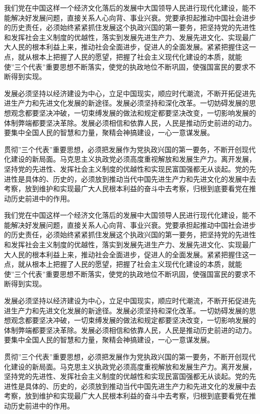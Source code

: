 \documentclass[adobefonts]{njuthesis}
\begin{document}
我们党在中国这样一个经济文化落后的发展中大国领导人民进行现代化建设，能不能解决好发展问题，直接关系人心向背、事业兴衰。党要承担起推动中国社会进步的历史责任，必须始终紧紧抓住发展这个执政兴国的第一要务，把坚持党的先进性和发挥社会主义制度的优越性，落实到发展先进生产力、发展先进文化、实现最广大人民的根本利益上来，推动社会全面进步，促进人的全面发展。紧紧把握住这一点，就从根本上把握了人民的愿望，把握了社会主义现代化建设的本质，就能使”三个代表”重要思想不断落实，使党的执政地位不断巩固，使强国富民的要求不断得到实现。 

发展必须坚持以经济建设为中心，立足中国现实，顺应时代潮流，不断开拓促进先进生产力和先进文化发展的新途径。发展必须坚持和深化改革。一切妨碍发展的思想观念都要坚决冲破，一切束缚发展的做法和规定都要坚决改变，一切影响发展的体制弊端都要坚决革除。发展必须相信和依靠人民，人民是推动历史前进的动力。要集中全国人民的智慧和力量，聚精会神搞建设，一心一意谋发展。 

贯彻”三个代表”重要思想，必须把发展作为党执政兴国的第一要务，不断开创现代化建设的新局面。马克思主义执政党必须高度重视解放和发展生产力。离开发展，坚持党的先进性、发挥社会主义制度的优越性和实现民富国强都无从谈起。党的先进性是具体的、历史的，必须放到推动当代中国先进生产力和先进文化的发展中去考察，放到维护和实现最广大人民根本利益的奋斗中去考察，归根到底要看党在推动历史前进中的作用。 

我们党在中国这样一个经济文化落后的发展中大国领导人民进行现代化建设，能不能解决好发展问题，直接关系人心向背、事业兴衰。党要承担起推动中国社会进步的历史责任，必须始终紧紧抓住发展这个执政兴国的第一要务，把坚持党的先进性和发挥社会主义制度的优越性，落实到发展先进生产力、发展先进文化、实现最广大人民的根本利益上来，推动社会全面进步，促进人的全面发展。紧紧把握住这一点，就从根本上把握了人民的愿望，把握了社会主义现代化建设的本质，就能使”三个代表”重要思想不断落实，使党的执政地位不断巩固，使强国富民的要求不断得到实现。 

发展必须坚持以经济建设为中心，立足中国现实，顺应时代潮流，不断开拓促进先进生产力和先进文化发展的新途径。发展必须坚持和深化改革。一切妨碍发展的思想观念都要坚决冲破，一切束缚发展的做法和规定都要坚决改变，一切影响发展的体制弊端都要坚决革除。发展必须相信和依靠人民，人民是推动历史前进的动力。要集中全国人民的智慧和力量，聚精会神搞建设，一心一意谋发展。 

贯彻”三个代表”重要思想，必须把发展作为党执政兴国的第一要务，不断开创现代化建设的新局面。马克思主义执政党必须高度重视解放和发展生产力。离开发展，坚持党的先进性、发挥社会主义制度的优越性和实现民富国强都无从谈起。党的先进性是具体的、历史的，必须放到推动当代中国先进生产力和先进文化的发展中去考察，放到维护和实现最广大人民根本利益的奋斗中去考察，归根到底要看党在推动历史前进中的作用。 
\end{document}
